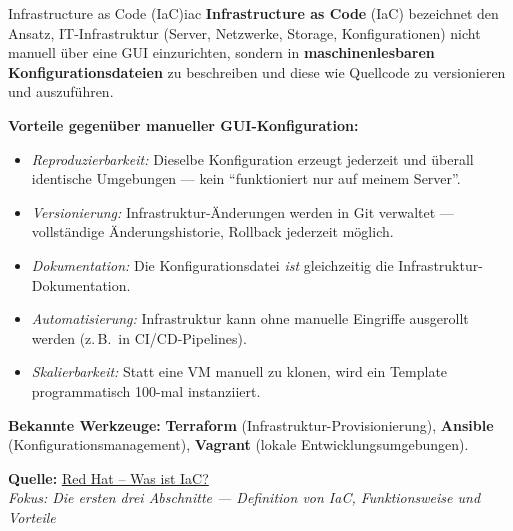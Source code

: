 \documentclass[a4paper,10pt,addpoints]{exam}
\begin{document}
\begin{infoBox}{Infrastructure as Code (IaC)}{iac}
  \textbf{Infrastructure as Code} (IaC) bezeichnet den Ansatz, IT-Infrastruktur
  (Server, Netzwerke, Storage, Konfigurationen) nicht manuell über eine GUI
  einzurichten, sondern in \textbf{maschinenlesbaren Konfigurationsdateien}
  zu beschreiben und diese wie Quellcode zu versionieren und auszuführen.

  \medskip
  \textbf{Vorteile gegenüber manueller GUI-Konfiguration:}
  \begin{itemize}
    \item \emph{Reproduzierbarkeit:} Dieselbe Konfiguration erzeugt jederzeit
      und überall identische Umgebungen --- kein
      \enquote{funktioniert nur auf meinem Server}.
    \item \emph{Versionierung:} Infrastruktur-Änderungen werden in Git
      verwaltet --- vollständige Änderungshistorie, Rollback jederzeit möglich.
    \item \emph{Dokumentation:} Die Konfigurationsdatei \emph{ist} gleichzeitig
      die Infrastruktur-Dokumentation.
    \item \emph{Automatisierung:} Infrastruktur kann ohne manuelle Eingriffe
      ausgerollt werden (z.\,B.\ in CI/CD-Pipelines).
    \item \emph{Skalierbarkeit:} Statt eine VM manuell zu klonen, wird ein
      Template programmatisch 100-mal instanziiert.
  \end{itemize}

  \medskip
  \textbf{Bekannte Werkzeuge:} \textbf{Terraform} (Infrastruktur-Provisionierung),
  \textbf{Ansible} (Konfigurationsmanagement), \textbf{Vagrant}
  (lokale Entwicklungsumgebungen).

  \medskip\small
  \textbf{Quelle:} \href{https://www.redhat.com/de/topics/automation/what-is-infrastructure-as-code-iac}{Red Hat -- Was ist IaC?}\\
  \hspace*{0.4em}\textit{Fokus: Die ersten drei Abschnitte ---
    Definition von IaC, Funktionsweise und Vorteile}
\end{infoBox}
\end{document}
